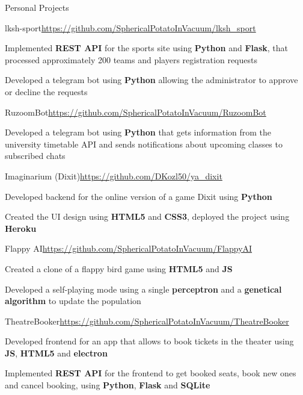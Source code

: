 \documentclass{./resume} %
\begin{document}

\begin{rSection}{Personal Projects}
    \begin{rSubsection}{lksh-sport}{\url{https://github.com/SphericalPotatoInVacuum/lksh_sport}}{}{}
        \item Implemented \textbf{REST API} for the sports site using \textbf{Python} and \textbf{Flask}, that processed approximately 200 teams and players registration requests
        \item Developed a telegram bot using \textbf{Python} allowing the administrator to approve or decline the requests
    \end{rSubsection}
    \begin{rSubsection}{RuzoomBot}{\url{https://github.com/SphericalPotatoInVacuum/RuzoomBot}}{}{}
        \item Developed a telegram bot using \textbf{Python} that gets information from the university timetable API and sends notifications about upcoming classes to subscribed chats
    \end{rSubsection}
    \begin{rSubsection}{Imaginarium (Dixit)}{\url{https://github.com/DKozl50/ya_dixit}}{}{}
        \item Developed backend for the online version of a game Dixit using \textbf{Python}
        \item Created the UI design using \textbf{HTML5} and \textbf{CSS3}, deployed the project using \textbf{Heroku}
    \end{rSubsection}
    \begin{rSubsection}{Flappy AI}{\url{https://github.com/SphericalPotatoInVacuum/FlappyAI}}{}{}
        \item Created a clone of a flappy bird game using \textbf{HTML5} and \textbf{JS}
        \item Developed a self-playing mode using a single \textbf{perceptron} and a \textbf{genetical algorithm} to update the population
    \end{rSubsection}
    \begin{rSubsection}{TheatreBooker}{\url{https://github.com/SphericalPotatoInVacuum/TheatreBooker}}{}{}
        \item Developed frontend for an app that allows to book tickets in the theater using \textbf{JS}, \textbf{HTML5} and \textbf{electron}
        \item Implemented \textbf{REST API} for the frontend to get booked seats, book new ones and cancel booking, using \textbf{Python}, \textbf{Flask} and \textbf{SQLite}
    \end{rSubsection}
\end{rSection}
\end{document}
